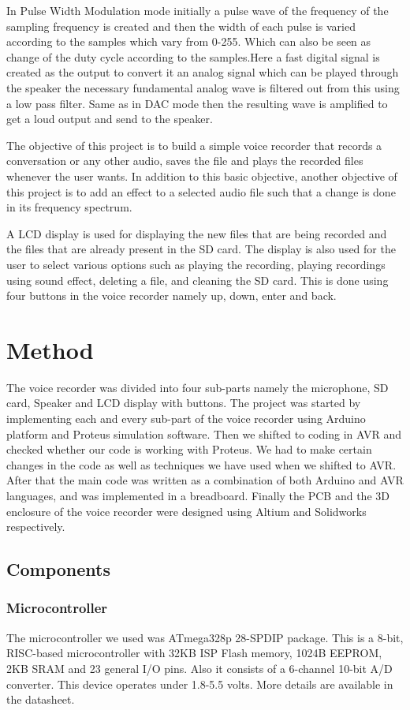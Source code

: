 \documentclass[11pt]{article}
\begin{document}
In Pulse Width Modulation mode initially a pulse wave of the frequency of the sampling frequency is created and then the width of each pulse is varied according to the samples which vary from 0-255. Which can also be seen as change of the duty cycle according to the samples.Here a fast digital signal is created as the output to convert it an analog signal which can be played through the speaker the necessary fundamental analog wave is filtered out from this using a low pass filter\cite{filters}. Same as in DAC mode then the resulting wave is amplified to get a loud output and send to the speaker.

The objective of this project is to build a simple voice recorder that records a conversation or any other audio, saves the file and plays the recorded files whenever the user wants. In addition to this basic objective, another objective of this project is to add an effect to a selected audio file such that a change is done in its frequency spectrum. 

A LCD display is used for displaying the new files that are being recorded and the files that are already present in the SD card. The display is also used for the user to select various options such as playing the recording, playing recordings using sound effect, deleting a file, and cleaning the SD card. This is done using four buttons in the voice recorder namely up, down, enter and back.

\section{Method}
The voice recorder was divided into four sub-parts namely the microphone, SD card, Speaker and LCD display with buttons. The project was started by implementing each and every sub-part of the voice recorder using Arduino platform and Proteus simulation software. Then we shifted to coding in AVR and checked whether our code is working with Proteus. We had to make certain changes in the code as well as techniques we have used when we shifted to AVR. After that the main code was written as a combination of both Arduino and AVR languages, and was implemented in a breadboard. Finally the PCB and the 3D enclosure of the voice recorder were designed using Altium and Solidworks respectively.

\subsection{Components}
\subsubsection{Microcontroller}
The microcontroller we used was ATmega328p 28-SPDIP package. This is a 8-bit, RISC-based microcontroller with 32KB ISP Flash memory, 1024B EEPROM, 2KB SRAM and 23 general I/O pins. Also it consists of a 6-channel 10-bit A/D converter. This device operates under 1.8-5.5 volts. More details are available in the datasheet\cite{328p}.
\end{document}
